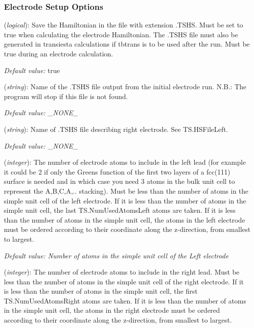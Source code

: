 \documentclass[11pt]{article}
\begin{document}
\subsubsection{Electrode Setup Options}

\begin{description}
\itemsep 10pt
\parsep 0pt

\item[{\bf TS.SaveHS}] ({\it logical}): 
Save the Hamiltonian in the file with extension .TSHS. 
Must be set to true when calculating the electrode Hamiltonian. 
The .TSHS file must also be generated in transiesta calculations 
if tbtrans is to be used after the run. Must be true during an 
electrode calculation. 

{\it Default value:} true

\item[{\bf TS.HSFileLeft }] ({\it string}): 
Name of the .TSHS file output from the initial electrode run. 
N.B.: The program will stop if this file is not found.

{\it Default value: \_NONE\_} 

\item[{\bf TS.HSFileRight }] ({\it string}): 
Name of .TSHS file describing right electrode. See TS.HSFileLeft. 

{\it Default value: \_NONE\_ } 

\item[{\bf TS.NumUsedAtomsLeft}] ({\it integer}): 
The number of electrode atoms to include in the left lead (for example 
it could be 2 if only the Greens function of the first two layers of a 
fcc(111) surface is needed and in which case you need 3 atoms in the 
bulk unit cell to represent the A,B,C,A,.. stacking). Must be less 
than the number of atoms in the simple unit cell of the left electrode. 
If it is less than the number of atoms in the simple unit cell, the last 
TS.NumUsedAtomsLeft atoms are taken. If it is less than the number of atoms 
in the simple unit cell, the atoms in the left electrode must be ordered 
according to their coordinate along the z-direction, from smallest 
to largest.

{\it Default value: Number of atoms in the simple unit cell of the Left electrode } 

\item[{\bf TS.NumUsedAtomsRight}] ({\it integer}): 
The number of electrode atoms to include in the right lead. Must be less than the number of 
atoms in the simple unit cell of the right electrode. If it is less than the number of atoms 
in the simple unit cell, the first TS.NumUsedAtomsRight atoms are taken. If it is less than 
the number of atoms in the simple unit cell, the atoms in the right electrode must be ordered 
according to their coordinate along the z-direction, from smallest to largest.


\end{description}
\end{document}
